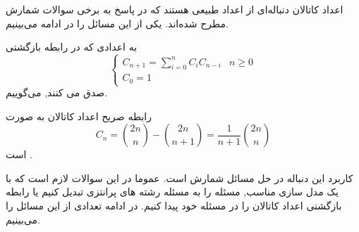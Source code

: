 \p
اعداد کاتالان دنباله‌ای از اعداد طبیعی هستند که در پاسخ به برخی سوالات شمارش مطرح شده‌اند.
یکی از این مسائل را در ادامه می‌بینیم.


\begin{DEFINITION}
    \p
      به اعدادی که در رابطه بازگشتی
    \[\begin{cases}
        C_{n+1}=\sum_{i=0}^n C_iC_{n-i} & n\geq 0 \\
        
        C_0=1
    \end{cases}
    \]
    صدق می کنند,
      می‌گوییم.
\end{DEFINITION}


\begin{THEOREM}
    رابطه صریح اعداد کاتالان به صورت
    \[C_n=\binom{2n}{n}-\binom{2n}{n+1}=\dfrac{1}{n+1}\binom{2n}{n}\]
    است
    .
\end{THEOREM}

 کاربرد این دنباله در حل مسائل شمارش است. عموما در این سوالات لازم است که با یک مدل سازی مناسب, مسئله را به مسئله رشته های پرانتزی تبدیل کنیم یا رابطه بازگشتی اعداد کاتالان را در مسئله خود پیدا کنیم. در ادامه تعدادی از این مسائل را می‌بینیم.
%
